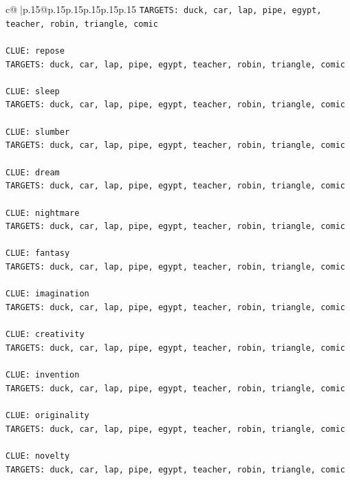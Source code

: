 \documentclass{article}
\begin{document}
{\begin{supertabular}{c@{$\;$}|p{.15\linewidth}@{}p{.15\linewidth}p{.15\linewidth}p{.15\linewidth}p{.15\linewidth}p{.15\linewidth}}
{{{\texttt{TARGETS: duck, car, lap, pipe, egypt, teacher, robin, triangle, comic} \\
\\ 
\texttt{CLUE: repose} \\
\texttt{TARGETS: duck, car, lap, pipe, egypt, teacher, robin, triangle, comic} \\
\\ 
\texttt{CLUE: sleep} \\
\texttt{TARGETS: duck, car, lap, pipe, egypt, teacher, robin, triangle, comic} \\
\\ 
\texttt{CLUE: slumber} \\
\texttt{TARGETS: duck, car, lap, pipe, egypt, teacher, robin, triangle, comic} \\
\\ 
\texttt{CLUE: dream} \\
\texttt{TARGETS: duck, car, lap, pipe, egypt, teacher, robin, triangle, comic} \\
\\ 
\texttt{CLUE: nightmare} \\
\texttt{TARGETS: duck, car, lap, pipe, egypt, teacher, robin, triangle, comic} \\
\\ 
\texttt{CLUE: fantasy} \\
\texttt{TARGETS: duck, car, lap, pipe, egypt, teacher, robin, triangle, comic} \\
\\ 
\texttt{CLUE: imagination} \\
\texttt{TARGETS: duck, car, lap, pipe, egypt, teacher, robin, triangle, comic} \\
\\ 
\texttt{CLUE: creativity} \\
\texttt{TARGETS: duck, car, lap, pipe, egypt, teacher, robin, triangle, comic} \\
\\ 
\texttt{CLUE: invention} \\
\texttt{TARGETS: duck, car, lap, pipe, egypt, teacher, robin, triangle, comic} \\
\\ 
\texttt{CLUE: originality} \\
\texttt{TARGETS: duck, car, lap, pipe, egypt, teacher, robin, triangle, comic} \\
\\ 
\texttt{CLUE: novelty} \\
\texttt{TARGETS: duck, car, lap, pipe, egypt, teacher, robin, triangle, comic} \\
}}}
\end{supertabular}}
\end{document}
